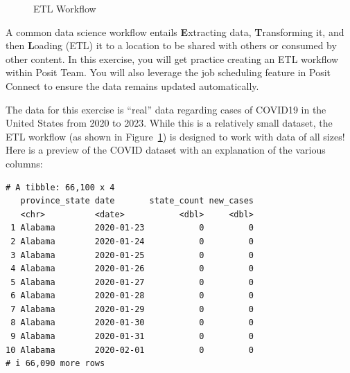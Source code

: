 \documentclass[
  letterpaper,
  DIV=11,
  numbers=noendperiod]{scrreprt}
\begin{document}
\begin{figure}


\caption{\label{fig-etl-workflow}ETL Workflow}

\end{figure}%

A common data science workflow entails \textbf{E}xtracting data,
\textbf{T}ransforming it, and then \textbf{L}oading (ETL) it to a
location to be shared with others or consumed by other content. In this
exercise, you will get practice creating an ETL workflow within Posit
Team. You will also leverage the job scheduling feature in Posit Connect
to ensure the data remains updated automatically.

The data for this exercise is ``real'' data regarding cases of COVID19
in the United States from 2020 to 2023. While this is a relatively small
dataset, the ETL workflow (as shown in Figure~\ref{fig-etl-workflow}) is
designed to work with data of all sizes! Here is a preview of the COVID
dataset with an explanation of the various columns:

\begin{verbatim}
# A tibble: 66,100 x 4
   province_state date       state_count new_cases
   <chr>          <date>           <dbl>     <dbl>
 1 Alabama        2020-01-23           0         0
 2 Alabama        2020-01-24           0         0
 3 Alabama        2020-01-25           0         0
 4 Alabama        2020-01-26           0         0
 5 Alabama        2020-01-27           0         0
 6 Alabama        2020-01-28           0         0
 7 Alabama        2020-01-29           0         0
 8 Alabama        2020-01-30           0         0
 9 Alabama        2020-01-31           0         0
10 Alabama        2020-02-01           0         0
# i 66,090 more rows
\end{verbatim}
\end{document}
